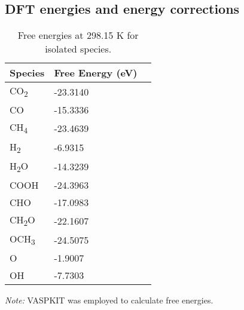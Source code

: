 \subsection{DFT energies and energy corrections}
\label{supp_sec2.3_energies}

\begin{table}[htbp]
\label{supp_table2:species_free_energies}
  \caption{Free energies at 298.15 K for isolated species.}
  \center
  \small
  \begin{tabularx}{0.5\textwidth}{@{}lXr@{}}
    \toprule
    Species               & Free Energy (eV)  \\
    \midrule
    CO\textsubscript{2}   & -23.3140          \\
    CO                    & -15.3336          \\
    CH\textsubscript{4}   & -23.4639          \\
    H\textsubscript{2}    & -6.9315           \\
    H\textsubscript{2}O   & -14.3239          \\
    COOH                  & -24.3963          \\
    CHO                   & -17.0983          \\
    CH\textsubscript{2}O  & -22.1607          \\
    OCH\textsubscript{3}  & -24.5075          \\
    O                     & -1.9007           \\
    OH                    & -7.7303           \\
    \bottomrule
  \end{tabularx}

  \smallskip

  \begin{flushright}
  \begin{minipage}{\textwidth}
    \footnotesize\textit{Note:} VASPKIT \cite{wang2021vaspkit} was employed to calculate free energies.
  \end{minipage}
  \end{flushright}
\end{table}

